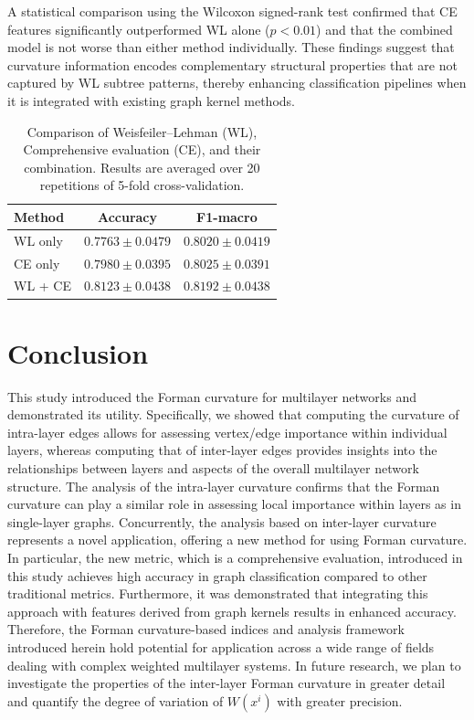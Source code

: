 \documentclass[preprint,12pt,number]{elsarticle}
\theoremstyle{plain} %
\theoremstyle{definition} %
\begin{document}
A statistical comparison using the Wilcoxon signed-rank test confirmed that CE features significantly outperformed WL alone ($p < 0.01$) and that the combined model is not worse than either method individually. These findings suggest that curvature information encodes complementary structural properties that are not captured by WL subtree patterns, thereby enhancing classification pipelines when it is integrated with existing graph kernel methods.

\begin{table}[H]
\centering
\caption{Comparison of Weisfeiler–Lehman (WL), Comprehensive evaluation (CE), and their combination. Results are averaged over 20 repetitions of 5-fold cross-validation.}
\label{tab:comparison with WL}
\begin{tabular}{lcc}
\hline
Method & Accuracy & F1-macro \\
\hline
WL only        & $0.7763 \pm 0.0479$ & $0.8020 \pm 0.0419$ \\
CE only        & $0.7980 \pm 0.0395$ & $0.8025 \pm 0.0391$ \\
WL + CE        & $0.8123 \pm 0.0438$ & $0.8192 \pm 0.0438$ \\
\hline
\end{tabular}
\end{table}

\section{Conclusion}
This study introduced the Forman curvature for multilayer networks and demonstrated its utility. Specifically, we showed that computing the curvature of intra-layer edges allows for assessing vertex/edge importance within individual layers, whereas computing that of inter-layer edges provides insights into the relationships between layers and aspects of the overall multilayer network structure. The analysis of the intra-layer curvature confirms that the Forman curvature can play a similar role in assessing local importance within layers as in single-layer graphs. Concurrently, the analysis based on inter-layer curvature represents a novel application, offering a new method for using Forman curvature. In particular, the new metric, which is a comprehensive evaluation, introduced in this study achieves high accuracy in graph classification compared to other traditional metrics. Furthermore, it was demonstrated that integrating this approach with features derived from graph kernels results in enhanced accuracy.
Therefore, the Forman curvature-based indices and analysis framework introduced herein hold potential for application across a wide range of fields dealing with complex weighted multilayer systems. In future research, we plan to investigate the properties of the inter-layer Forman curvature in greater detail and quantify the degree of variation of $W(x^i)$ with greater precision.
\end{document}
